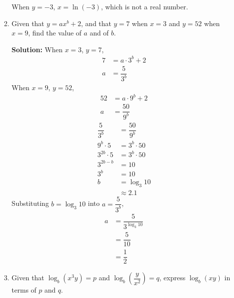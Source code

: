 \documentclass{report}
\newcommand{\sol}{\vspace{0.2cm}\textbf{Solution:}\vspace{0.2cm}}
\begin{document}
\begin{multicols*}{2}
\begin{enumerate}[leftmargin=*]
\begin{enumerate}
                        When $y = -3$, $x = \ln (-3)$, which is not a real number.

                  \item Given that $y=a x^b+2$, and that $y=7$ when $x=3$ and $y=52$ when $x=9$, find
                        the value of $a$ and of $b$.

                        \sol{}
                        When $x = 3$, $y = 7$,
                        \begin{align*}
                            7 & = a \cdot 3^b + 2 \\
                            a & = \dfrac{5}{3^b}
                        \end{align*}
                        When $x = 9$, $y = 52$,
                        \begin{align*}
                            52 & = a \cdot 9^b + 2 \\
                            a  & = \dfrac{50}{9^b}
                        \end{align*}
                        \begin{align*}
                            \dfrac{5}{3^b} & = \dfrac{50}{9^b} \\
                            9^b \cdot 5    & = 3^b \cdot 50    \\
                            3^{2b} \cdot 5 & = 3^b \cdot 50    \\
                            3^{2b - b}     & = 10              \\
                            3^b            & = 10              \\
                            b              & = \log_3 10       \\
                                           & \approx 2.1
                        \end{align*}
                        Substituting $b = \log_3 10$ into $a = \dfrac{5}{3^b}$,
                        \begin{align*}
                            a & = \dfrac{5}{3^{\log_3 10}} \\
                              & = \dfrac{5}{10}            \\
                              & = \dfrac{1}{2}
                        \end{align*}

                        \newpage
                  \item Given that $\log _b\left(x^3 y\right)=p$ and $\log
                            _b\left(\dfrac{y}{x^2}\right)=q$, express $\log _b(x y)$ in terms of $p$ and
                        $q$.


\end{enumerate}
\end{enumerate}
\end{multicols*}
\end{document}
